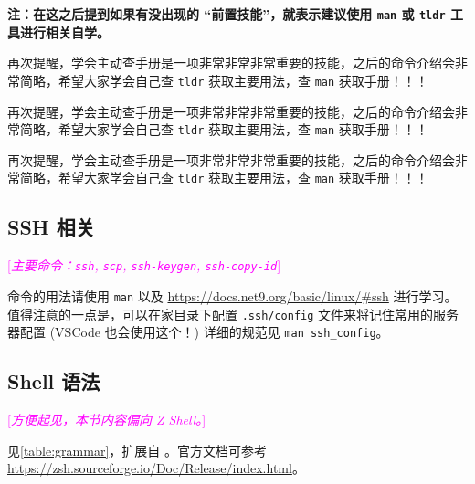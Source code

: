 \documentclass{article}
\begin{document}
	{\color{red}\bfseries 注：在这之后提到如果有没出现的 ``前置技能''，就表示建议使用 \texttt{man} 或 \texttt{tldr} 工具进行相关自学。\par
	再次提醒，学会主动查手册是一项非常非常非常重要的技能，之后的命令介绍会非常简略，希望大家学会自己查 \texttt{tldr} 获取主要用法，查 \texttt{man} 获取手册！！！\par
	再次提醒，学会主动查手册是一项非常非常非常重要的技能，之后的命令介绍会非常简略，希望大家学会自己查 \texttt{tldr} 获取主要用法，查 \texttt{man} 获取手册！！！\par
	再次提醒，学会主动查手册是一项非常非常非常重要的技能，之后的命令介绍会非常简略，希望大家学会自己查 \texttt{tldr} 获取主要用法，查 \texttt{man} 获取手册！！！}

	\subsection{SSH 相关}

	\textcolor{fuchsia}{[\textit{主要命令：\texttt{ssh}, \texttt{scp}, \texttt{ssh-keygen}, \texttt{ssh-copy-id}}]}

	命令的用法请使用 \texttt{man} 以及 \url{https://docs.net9.org/basic/linux/#ssh} 进行学习。值得注意的一点是，可以在家目录下配置 \texttt{.ssh/config} 文件来将记住常用的服务器配置 (VSCode 也会使用这个！) 详细的规范见 \verb!man ssh_config!。

	\subsection{Shell 语法}

	\textcolor{fuchsia}{[\textit{方便起见，本节内容偏向 Z Shell。}]}

	见\autoref{table:grammar}，扩展自 \cite{lbwvssl}。官方文档可参考 \url{https://zsh.sourceforge.io/Doc/Release/index.html}。
\end{document}
